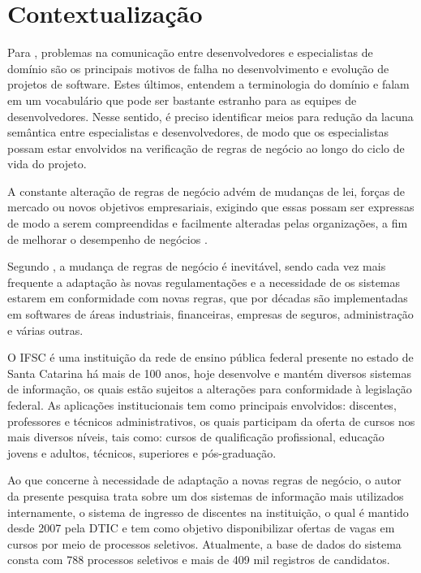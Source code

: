 \section{Contextualização}
\label{contextualizacao}

 Para , problemas na comunicação entre desenvolvedores e especialistas de domínio são os principais motivos de falha no desenvolvimento e evolução de projetos de software. Estes últimos, entendem a terminologia do domínio e falam em um vocabulário que pode ser bastante estranho para as equipes de desenvolvedores. Nesse sentido, é preciso identificar meios para redução da lacuna semântica entre especialistas e desenvolvedores, de modo que os especialistas possam estar envolvidos na verificação de regras de negócio ao longo do ciclo de vida do projeto.

 A constante alteração de regras de negócio advém de mudanças de lei, forças de mercado ou novos objetivos empresariais, exigindo que essas possam ser expressas de modo a serem compreendidas e facilmente alteradas pelas organizações, a fim de melhorar o desempenho de negócios \cite{flexiblerules}.
 
 Segundo , a mudança de regras de negócio é inevitável, sendo cada vez mais frequente a adaptação às novas regulamentações e a necessidade de os sistemas estarem em conformidade com novas regras, que por décadas são implementadas em softwares de áreas industriais, financeiras, empresas de seguros, administração e várias outras.
 
 O \gls{IFSC} é uma instituição da rede de ensino pública federal presente no estado de Santa Catarina há mais de 100 anos, hoje desenvolve e mantém diversos sistemas de informação, os quais estão sujeitos a alterações para conformidade à legislação federal. As aplicações institucionais tem como principais envolvidos: discentes, professores e técnicos administrativos, os quais participam da oferta de cursos nos mais diversos níveis, tais como: cursos de qualificação profissional, educação jovens e adultos, técnicos, superiores e pós-graduação. 
 
 Ao que concerne à necessidade de adaptação a novas regras de negócio, o autor da presente pesquisa trata sobre um dos sistemas de informação mais utilizados internamente, o sistema de ingresso de discentes na instituição, o qual é mantido desde 2007 pela \gls{DTIC} e tem como objetivo disponibilizar ofertas de vagas em cursos por meio de processos seletivos. Atualmente, a base de dados do sistema consta com 788 processos seletivos e mais de 409 mil registros de candidatos.
 

